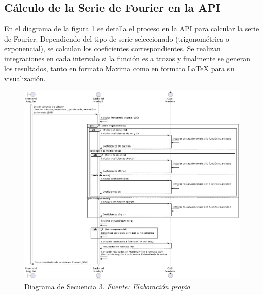 \subsection{Cálculo de la Serie de Fourier en la API}
En el diagrama de  la figura \ref{fig:Diagrama_secuencia_3} se detalla el proceso en la API para calcular la serie de Fourier. Dependiendo del tipo de serie seleccionado (trigonométrica o exponencial), se calculan los coeficientes correspondientes. Se realizan integraciones en cada intervalo si la función es a trozos y finalmente se generan los resultados, tanto en formato Maxima como en formato LaTeX para su visualización.
\begin{figure}[H]
	\centering
	\includegraphics[width=1\textwidth]{img/chapter04/DS3.pdf}
	\caption[Diagrama de Secuencia 3.]{Diagrama de Secuencia 3. \textit{Fuente: \textit{Elaboración propia}}}
	\label{fig:Diagrama_secuencia_3}
\end{figure}

\newpage


